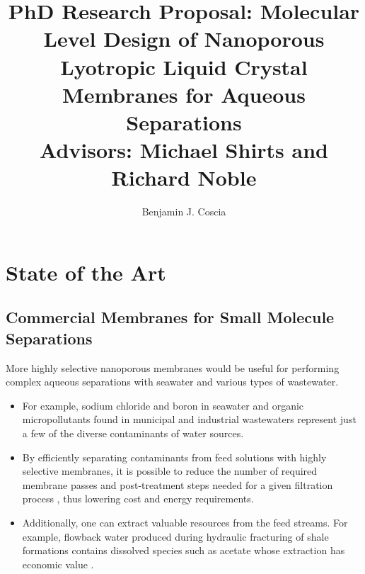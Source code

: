 \documentclass{article}
\title{PhD Research Proposal: Molecular Level Design of Nanoporous Lyotropic Liquid
Crystal Membranes for Aqueous Separations \\ \vspace{0.5cm}
\large Advisors: Michael Shirts and Richard Noble}
\author{Benjamin J. Coscia}
\begin{document}
  \graphicspath{{./figures/}}

  \maketitle
  \thispagestyle{empty}
  \clearpage
  \setcounter{page}{1} %

  \section{State of the Art}\label{section:state-of-the-art}

  \subsection*{Commercial Membranes for Small Molecule Separations}
  
  
  More highly selective nanoporous membranes would be useful for 
  performing complex aqueous separations with seawater and various
  types of wastewater.

  \begin{itemize}
    \item For example, sodium chloride and boron in seawater 
    \cite{fritzmann_state---art_2007} and organic micropollutants found in
    municipal and industrial wastewaters \cite{schwarzenbach_challenge_2006}
    represent just a few of the diverse contaminants of water sources. 
    \item By efficiently separating contaminants from feed solutions with
    highly selective membranes, it is possible to reduce the number of 
    required membrane passes and post-treatment steps needed for a given 
    filtration process \cite{werber_materials_2016}, thus lowering cost
    and energy requirements. 
    \item Additionally, one can extract valuable resources from the 
    feed streams. For example, flowback water produced during hydraulic
    fracturing of shale formations contains dissolved species such as acetate
    whose extraction has economic value \cite{dischinger_application_2017}.
  \end{itemize}
\end{document}
